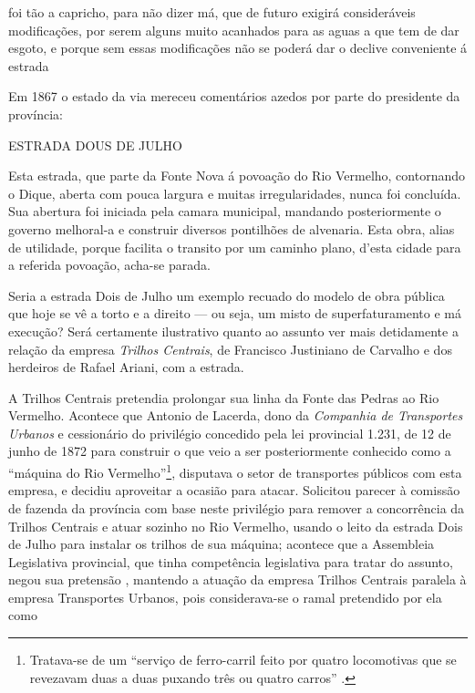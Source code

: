 \begin{citacao}
foi tão a capricho, para não dizer má, que de futuro exigirá consideráveis modificações, por serem alguns muito acanhados para as aguas a que tem de dar esgoto, e porque sem essas modificações não se poderá dar o declive conveniente á estrada \cite[p.~76]{bahia_rpe_1866}
\end{citacao}

Em 1867 o estado da via mereceu comentários azedos por parte do presidente da província:

\begin{citacao}
ESTRADA DOUS DE JULHO

Esta estrada, que parte da Fonte Nova á povoação do Rio Vermelho, contornando o Dique, aberta com pouca largura e muitas irregularidades, nunca foi concluída. Sua abertura foi iniciada pela camara municipal, mandando posteriormente o governo melhoral-a e construir diversos pontilhões de alvenaria. 
Esta obra, alias de utilidade, porque facilita o transito por um caminho plano, d'esta cidade para a referida povoação, acha-se parada. \cite[obras publicas,~p.~9]{bahia_rpe_1867}
\end{citacao}

Seria a estrada Dois de Julho um exemplo recuado do modelo de obra pública que hoje se vê a torto e a direito --- ou seja, um misto de superfaturamento e má execução? Será certamente ilustrativo quanto ao assunto ver mais detidamente a relação da empresa \textit{Trilhos Centrais}, de Francisco Justiniano de Carvalho e dos herdeiros de Rafael Ariani, com a estrada.

A Trilhos Centrais pretendia prolongar sua linha da Fonte das Pedras ao Rio Vermelho. Acontece que Antonio de Lacerda, dono da \textit{Companhia de Transportes Urbanos} e cessionário do privilégio concedido pela lei provincial 1.231, de 12 de junho de 1872 para construir o que veio a ser posteriormente conhecido como a ``máquina do Rio Vermelho''\footnote{Tratava-se de um ``serviço de ferro-carril feito por quatro locomotivas que se revezavam duas a duas puxando três ou quatro carros'' \cite[p.~90]{trinchao_parafuso_2010}.}, disputava o setor de transportes públicos com esta empresa, e decidiu aproveitar a ocasião para atacar. Solicitou parecer à comissão de fazenda da província com base neste privilégio para remover a concorrência da Trilhos Centrais e atuar sozinho no Rio Vermelho, usando o leito da estrada Dois de Julho para instalar os trilhos de sua máquina; acontece que a Assembleia Legislativa provincial, que tinha competência legislativa para tratar do assunto, negou sua pretensão \cite[p.~250]{bahia_relatassleg_1875}, mantendo a atuação da empresa Trilhos Centrais paralela à empresa Transportes Urbanos, pois considerava-se o ramal pretendido por ela como


